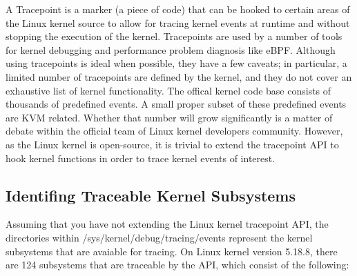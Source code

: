 \documentclass{report}
\begin{document}
\begin{spacing}{1.5}
{\large
A Tracepoint is a marker (a piece of code) that can be hooked to certain areas of the Linux kernel source to allow for tracing kernel events at runtime and without stopping the execution of the kernel. Tracepoints are used by a number of tools for kernel debugging and performance problem diagnosis like eBPF. Although using tracepoints is ideal when possible, they have a few caveats; in particular, a limited number of tracepoints are defined by the kernel, and they do not cover an exhaustive list of kernel functionality. The offical kernel code base consists of thousands of predefined events. A small proper subset of these predefined events are KVM related. Whether that number will grow significantly is a matter of debate within the official team of Linux kernel developers community. However, as the Linux kernel is open-source, it is trivial to extend the tracepoint API to hook kernel functions in order to trace kernel events of interest.
\newline
}


\subsection{Identifing Traceable Kernel Subsystems}

{\large
Assuming that you have not extending the Linux kernel tracepoint API, the directories within /sys/kernel/debug/tracing/events represent the kernel subsystems that are avaiable for tracing. On Linux kernel version 5.18.8, there are 124 subsystems that are traceable by the API, which consist of the following:

}
\end{spacing}
\end{document}
